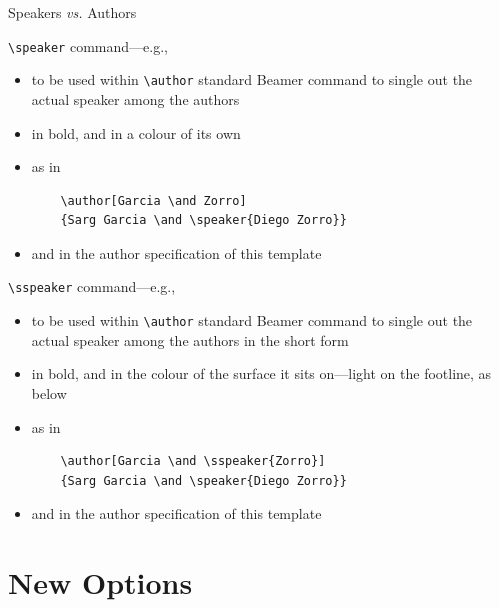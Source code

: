 \documentclass[presentation,cesena,apice]{beamer}\mode<presentation>{\usetheme{AMSBolognaFC}}
\begin{document}
\begin{frame}{Speakers \emph{vs.} Authors}
%
\begin{exampleblock}{\texttt{\textbackslash{}speaker} command---e.g., }
\begin{itemize}
	\item to be used within \texttt{\textbackslash{}author} standard Beamer command to single out the actual speaker among the authors
	\item in bold, and in a colour of its own
	\item[e.g.] as in
\begin{verbatim}
	\author[Garcia \and Zorro]
	{Sarg Garcia \and \speaker{Diego Zorro}}
\end{verbatim}
	\item and in the author specification of this template
\end{itemize}
\end{exampleblock}
%
\begin{block}{\texttt{\textbackslash{}sspeaker} command---e.g., }
\begin{itemize}
	\item to be used within \texttt{\textbackslash{}author} standard Beamer command to single out the actual speaker among the authors in the short form
	\item in bold, and in the colour of the surface it sits on---light on the footline, as below
	\item[e.g.] as in
\begin{verbatim}
	\author[Garcia \and \sspeaker{Zorro}]
	{Sarg Garcia \and \speaker{Diego Zorro}}
\end{verbatim}
	\item and in the author specification of this template
\end{itemize}
\end{block}

\end{frame}

\section{New Options}
\end{document}
